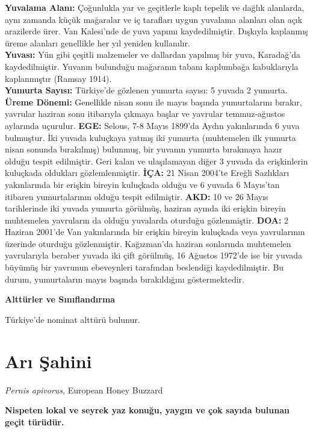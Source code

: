 \documentclass[
  letterpaper,
  DIV=11,
  numbers=noendperiod]{scrreprt}
\begin{document}
\textbf{Yuvalama Alanı:} Çoğunlukla yar ve geçitlerle kaplı tepelik ve
dağlık alanlarda, aynı zamanda küçük mağaralar ve iç tarafları uygun
yuvalama alanları olan açık arazilerde ürer. Van Kalesi'nde de yuva
yapımı kaydedilmiştir. Dışkıyla kaplanmış üreme alanları genellikle her
yıl yeniden kullanılır.\\
\textbf{Yuvası:} Yün gibi çeşitli malzemeler ve dallardan yapılmış bir
yuva, Karadağ'da kaydedilmiştir. Yuvanın bulunduğu mağaranın tabanı
kaplumbağa kabuklarıyla kaplanmıştır (Ramsay 1914).\\
\textbf{Yumurta Sayısı:} Türkiye'de gözlenen yumurta sayısı: 5 yuvada 2
yumurta.\\
\textbf{Üreme Dönemi:} Genellikle nisan sonu ile mayıs başında
yumurtalarını bırakır, yavrular haziran sonu itibarıyla çıkmaya başlar
ve yavrular temmuz-ağustos aylarında uçurulur. \textbf{EGE:} Selous, 7-8
Mayıs 1899'da Aydın yakınlarında 6 yuva bulmuştur. İki yuvada kuluçkaya
yatmış iki yumurta (muhtemelen ilk yumurta nisan sonunda bırakılmış)
bulunmuş, bir yuvanın yumurta bırakmaya hazır olduğu tespit edilmiştir.
Geri kalan ve ulaşılamayan diğer 3 yuvada da erişkinlerin kuluçkada
oldukları gözlemlenmiştir. \textbf{İÇA:} 21 Nisan 2004'te Ereğli
Sazlıkları yakınlarında bir erişkin bireyin kuluçkada olduğu ve 6 yuvada
6 Mayıs'tan itibaren yumurtalarının olduğu tespit edilmiştir.
\textbf{AKD:} 10 ve 26 Mayıs tarihlerinde iki yuvada yumurta görülmüş,
haziran ayında iki erişkin bireyin muhtemelen yavruların da olduğu
yuvalarda oturduğu gözlenmiştir. \textbf{DOA:} 2 Haziran 2001'de Van
yakınlarında bir erişkin bireyin kuluçkada veya yavrularının üzerinde
oturduğu gözlenmiştir. Kağızman'da haziran sonlarında muhtemelen
yavrularıyla beraber yuvada iki çift görülmüş, 16 Ağustos 1972'de ise
bir yuvada büyümüş bir yavrunun ebeveynleri tarafından beslendiği
kaydedilmiştir. Bu durum, yumurtaların mayıs başında bırakıldığını
göstermektedir.

\textbf{Alttürler ve Sınıflandırma}

Türkiye'de nominat alttürü bulunur.

\section{Arı Şahini}\label{arux131-ux15fahini}

\emph{Pernis apivorus}, European Honey Buzzard

\textbf{Nispeten lokal ve seyrek yaz konuğu, yaygın ve çok sayıda
bulunan geçit türüdür.}
\end{document}
